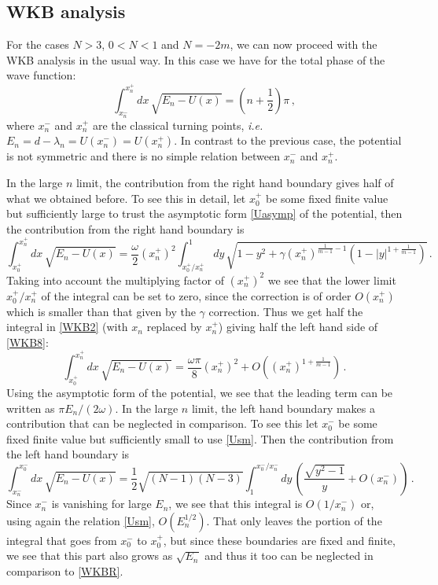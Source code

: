 \documentclass[11pt,a4paper]{article}
\numberwithin{figure}{section}
\numberwithin{equation}{section}
\newcommand{\be}{\begin{equation}}
\newcommand{\ee}{\end{equation}}
\newcommand\ie{\textit{i.e.}\ }
\begin{document}
\subsection{WKB analysis}
 
For the cases $N>3$, $0<N<1$ and $N=-2m$, we can now proceed with the WKB analysis in the usual way. In this case we have for the total phase of the wave function:
\begin{equation} \label{WKB_N}
    \int_{x^-_n}^{x^+_n} \!\!\!\! dx\, \sqrt{E_n - U(x)} = \left( n + \frac{1}{2} \right) \pi \,,
\end{equation}
where $x^-_n$ and $x^+_n$ are the classical turning points, \ie $E_n=d-\lambda_n=U(x^-_n)=U(x^+_n)$. In contrast to the previous case, the potential is not symmetric and there is no simple relation between $x^-_n$ and $x^+_n$. 

In the large $n$ limit, the contribution from the right hand boundary gives half of what we obtained before.  To see this in detail, let $x_0^+$ be some fixed finite value but sufficiently large to trust the asymptotic form \eqref{Uasymp} of the potential, then the contribution from the right hand boundary is
\be 
\int_{x^+_0}^{x^+_n} \!\!\!\! dx\, \sqrt{E_n - U(x)} = \frac{\omega}{2}(x^+_n)^2 \int_{x^+_0/x^+_n}^{1}\!\!\!\! dy\,\sqrt{1-y^2+\gamma (x^+_n)^{\frac{1}{m-1}-1}(1-|y|^{1+ \frac{1}{m-1}})}\,.
\ee
Taking into account the multiplying factor of $(x^+_n)^2$ we see that the lower limit $x^+_0/x^+_n$ of the integral can be set to zero, since the correction is of order $O(x^+_n)$ which is smaller than that given by the $\gamma$ correction. Thus we get half the integral in \eqref{WKB2} (with $x_n$ replaced by $x^+_n$) giving half the left hand side of \eqref{WKB8}:
\be 
\label{WKBR}
\int_{x^+_0}^{x^+_n} \!\!\!\! dx\, \sqrt{E_n - U(x)} =  \frac{\omega \pi}{8} (x^+_n)^2 + O\left( (x^+_n)^{1+\frac{1}{m-1}}\right)\,.
\ee
Using the asymptotic form of the potential, we see that the leading term can be written as $\pi E_n/(2\omega)$.
In the large $n$ limit, the left hand boundary makes a contribution that can be neglected in comparison. To see this let $x^-_0$ be some fixed finite value but sufficiently small to use \eqref{Usm}. Then the contribution from the left hand boundary is
\be 
\int_{x^-_n}^{x^-_0} \!\!\!\! dx\, \sqrt{E_n - U(x)} = \frac12\sqrt{(N-1)(N-3)}\int_1^{x^-_0/x^-_n}\!\!\!\! dy\,\left(\frac{\sqrt{y^2-1}}{y}+O(x^-_n)\right)\,.
\ee
Since $x^-_n$ is vanishing for large $E_n$, we see that this integral is $O(1/x^-_n)$ or, using again the relation \eqref{Usm}, $O(E^{1/2}_n)$. 
That only leaves the portion of the integral that goes from $x^-_0$ to $x^+_0$, but since these boundaries are fixed and finite, we see that this part also grows as $\sqrt{E_n}$ and thus it too can be neglected in comparison to \eqref{WKBR}.
\end{document}
